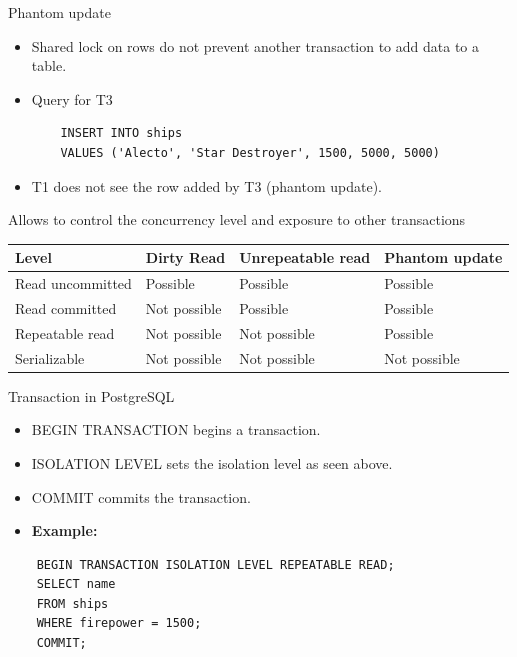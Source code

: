 \documentclass{beamer}
\begin{document}
\begin{frame}[fragile]{Phantom update}
	\begin{itemize}
	\item Shared lock on rows do not prevent another transaction to add data to a table.
	\item Query for T3
	\begin{lstlisting}
	INSERT INTO ships
	VALUES ('Alecto', 'Star Destroyer', 1500, 5000, 5000)
	\end{lstlisting}
	\item T1 does not see the row added by T3 (phantom update).
	\end{itemize}
\end{frame}



\begin{slide}{
	\item Allows to control the concurrency level and exposure to other transactions
	\begin{table}
		\tiny
		\begin{tabular}{|l|l|l|l|}
			\hline
			\textbf{Level} & \textbf{Dirty Read} & \textbf{Unrepeatable read} & \textbf{Phantom update} \\
			\hline
			Read uncommitted & Possible & Possible & Possible \\
			\hline
			Read committed & Not possible & Possible & Possible \\
			\hline
			Repeatable read & Not possible & Not possible & Possible \\
			\hline
			Serializable & Not possible & Not possible & Not possible \\
			\hline
		\end{tabular}
	\end{table}
}\end{slide}

\begin{frame}[fragile]{Transaction in PostgreSQL}
	\begin{itemize}
		\item BEGIN TRANSACTION begins a transaction.
		\item ISOLATION LEVEL sets the isolation level as seen above.
		\item COMMIT commits the transaction.
		\item \textbf{Example:}
	\end{itemize}
	\begin{lstlisting}
	BEGIN TRANSACTION ISOLATION LEVEL REPEATABLE READ;
	SELECT name
	FROM ships
	WHERE firepower = 1500;
	COMMIT;
	\end{lstlisting}
	
\end{frame}
\end{document}
